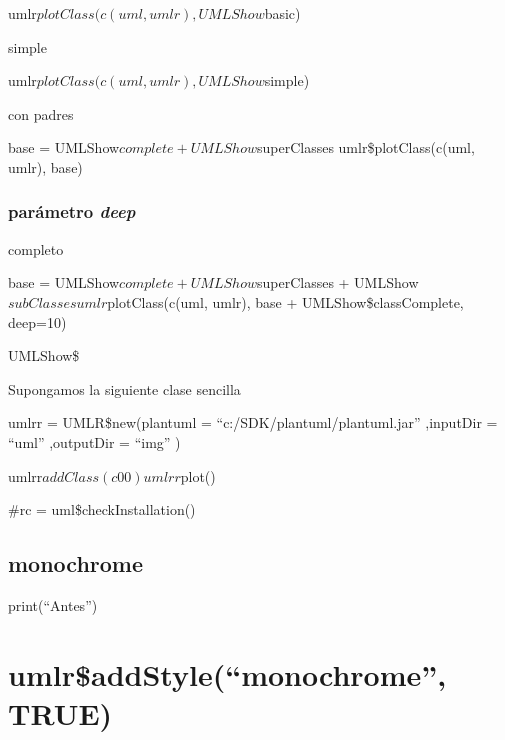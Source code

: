 \documentclass[
]{article}
\newenvironment{Shaded}{\begin{snugshade}}{\end{snugshade}}
\newcommand{\ControlFlowTok}[1]{\textcolor[rgb]{0.13,0.29,0.53}{\textbf{#1}}}
\newcommand{\DataTypeTok}[1]{\textcolor[rgb]{0.13,0.29,0.53}{#1}}
\newcommand{\KeywordTok}[1]{\textcolor[rgb]{0.13,0.29,0.53}{\textbf{#1}}}
\newcommand{\NormalTok}[1]{#1}
\newcommand{\OperatorTok}[1]{\textcolor[rgb]{0.81,0.36,0.00}{\textbf{#1}}}
\newcommand{\OtherTok}[1]{\textcolor[rgb]{0.56,0.35,0.01}{#1}}
\newcommand{\StringTok}[1]{\textcolor[rgb]{0.31,0.60,0.02}{#1}}
\begin{document}
umlr\(plotClass(c(uml, umlr), UMLShow\)basic)

simple

umlr\(plotClass(c(uml, umlr), UMLShow\)simple)

con padres

base = UMLShow\(complete + UMLShow\)superClasses umlr\$plotClass(c(uml,
umlr), base)

\hypertarget{paruxe1metro-deep}{%
\subsubsection{\texorpdfstring{parámetro
\emph{deep}}{parámetro deep}}\label{paruxe1metro-deep}}

completo

base = UMLShow\(complete + UMLShow\)superClasses +
UMLShow\(subClasses umlr\)plotClass(c(uml, umlr), base +
UMLShow\$classComplete, deep=10)

UMLShow\$

Supongamos la siguiente clase sencilla

\begin{Shaded}
\end{Shaded}

umlrr = UMLR\$new(plantuml = ``c:/SDK/plantuml/plantuml.jar'' ,inputDir
= ``uml'' ,outputDir = ``img'' )

umlrr\(addClass(c00)  umlrr\)plot()

\#rc = uml\$checkInstallation()

\hypertarget{monochrome}{%
\subsection{monochrome}\label{monochrome}}

print(``Antes'')

\hypertarget{umlraddstylemonochrome-true}{%
\section{umlr\$addStyle(``monochrome'',
TRUE)}\label{umlraddstylemonochrome-true}}
\end{document}
